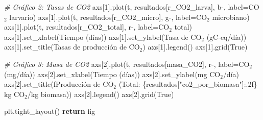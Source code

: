\documentclass[
]{article}
\newenvironment{Shaded}{}{}
\newcommand{\CommentTok}[1]{\textcolor[rgb]{0.38,0.63,0.69}{\textit{#1}}}
\newcommand{\ControlFlowTok}[1]{\textcolor[rgb]{0.00,0.44,0.13}{\textbf{#1}}}
\newcommand{\DecValTok}[1]{\textcolor[rgb]{0.25,0.63,0.44}{#1}}
\newcommand{\NormalTok}[1]{#1}
\newcommand{\OperatorTok}[1]{\textcolor[rgb]{0.40,0.40,0.40}{#1}}
\newcommand{\SpecialCharTok}[1]{\textcolor[rgb]{0.25,0.44,0.63}{#1}}
\newcommand{\SpecialStringTok}[1]{\textcolor[rgb]{0.73,0.40,0.53}{#1}}
\newcommand{\StringTok}[1]{\textcolor[rgb]{0.25,0.44,0.63}{#1}}
\newcommand{\VariableTok}[1]{\textcolor[rgb]{0.10,0.09,0.49}{#1}}
\begin{document}
\begin{Shaded}
\begin{Highlighting}[]
        \CommentTok{\# Gráfico 2: Tasas de CO2}
\NormalTok{        axs[}\DecValTok{1}\NormalTok{].plot(t, resultados[}\StringTok{\textquotesingle{}r\_CO2\_larva\textquotesingle{}}\NormalTok{], }\StringTok{\textquotesingle{}b{-}\textquotesingle{}}\NormalTok{, label}\OperatorTok{=}\StringTok{\textquotesingle{}CO$_2$ larvario\textquotesingle{}}\NormalTok{)}
\NormalTok{        axs[}\DecValTok{1}\NormalTok{].plot(t, resultados[}\StringTok{\textquotesingle{}r\_CO2\_micro\textquotesingle{}}\NormalTok{], }\StringTok{\textquotesingle{}g{-}\textquotesingle{}}\NormalTok{, label}\OperatorTok{=}\StringTok{\textquotesingle{}CO$_2$ microbiano\textquotesingle{}}\NormalTok{)}
\NormalTok{        axs[}\DecValTok{1}\NormalTok{].plot(t, resultados[}\StringTok{\textquotesingle{}r\_CO2\_total\textquotesingle{}}\NormalTok{], }\StringTok{\textquotesingle{}r{-}\textquotesingle{}}\NormalTok{, label}\OperatorTok{=}\StringTok{\textquotesingle{}CO$_2$ total\textquotesingle{}}\NormalTok{)}
\NormalTok{        axs[}\DecValTok{1}\NormalTok{].set\_xlabel(}\StringTok{\textquotesingle{}Tiempo (días)\textquotesingle{}}\NormalTok{)}
\NormalTok{        axs[}\DecValTok{1}\NormalTok{].set\_ylabel(}\StringTok{\textquotesingle{}Tasa de CO$_2$ (gC{-}eq/día)\textquotesingle{}}\NormalTok{)}
\NormalTok{        axs[}\DecValTok{1}\NormalTok{].set\_title(}\StringTok{\textquotesingle{}Tasas de producción de CO$_2$\textquotesingle{}}\NormalTok{)}
\NormalTok{        axs[}\DecValTok{1}\NormalTok{].legend()}
\NormalTok{        axs[}\DecValTok{1}\NormalTok{].grid(}\VariableTok{True}\NormalTok{)}
        
        \CommentTok{\# Gráfico 3: Masa de CO2}
\NormalTok{        axs[}\DecValTok{2}\NormalTok{].plot(t, resultados[}\StringTok{\textquotesingle{}masa\_CO2\textquotesingle{}}\NormalTok{], }\StringTok{\textquotesingle{}r{-}\textquotesingle{}}\NormalTok{, label}\OperatorTok{=}\StringTok{\textquotesingle{}CO$_2$ (mg/día)\textquotesingle{}}\NormalTok{)}
\NormalTok{        axs[}\DecValTok{2}\NormalTok{].set\_xlabel(}\StringTok{\textquotesingle{}Tiempo (días)\textquotesingle{}}\NormalTok{)}
\NormalTok{        axs[}\DecValTok{2}\NormalTok{].set\_ylabel(}\StringTok{\textquotesingle{}mg CO$_2$/día\textquotesingle{}}\NormalTok{)}
\NormalTok{        axs[}\DecValTok{2}\NormalTok{].set\_title(}\SpecialStringTok{f\textquotesingle{}Producción de CO$_2$ (Total: }\SpecialCharTok{\{}\NormalTok{resultados[}\StringTok{"co2\_por\_biomasa"}\NormalTok{]}\SpecialCharTok{:.2f\}}\SpecialStringTok{ kg CO$_2$/kg biomasa)\textquotesingle{}}\NormalTok{)}
\NormalTok{        axs[}\DecValTok{2}\NormalTok{].legend()}
\NormalTok{        axs[}\DecValTok{2}\NormalTok{].grid(}\VariableTok{True}\NormalTok{)}
        
\NormalTok{        plt.tight\_layout()}
        \ControlFlowTok{return}\NormalTok{ fig}
\end{Highlighting}
\end{Shaded}
\end{document}
